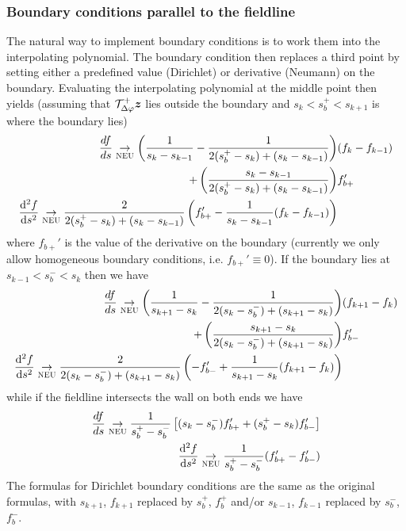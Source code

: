 \subsubsection{ Boundary conditions parallel to the fieldline}
The natural way to implement boundary conditions is to work them into the
interpolating polynomial. The boundary condition then replaces a third
point by setting
either a predefined value (Dirichlet) or derivative (Neumann) on the boundary.
Evaluating the interpolating polynomial at the middle point then yields
(assuming that $\mathcal T^+_{\Delta\varphi} {\boldsymbol{z}}$ lies outside the boundary and $s_k <s_b^+ < s_{k+1}$ is where the boundary lies)
\begin{align} \label{eq:paralleldis_neup}
    \frac{df}{ds}
    \underset{\textsc{NEU}}{\rightarrow}
    \left(\frac{ 1}{s_{k}-s_{k-1}} - \frac{1}{2(s_b^+-s_k) + (s_k-s_{k-1})} \right) &(f_k-f_{k-1})\nonumber\\
    +\left(\frac{s_k - s_{k-1}}{2(s_b^+-s_k) + (s_k-s_{k-1})}\right) &f_{b+}'\\
\label{eq:second_order_neup}
    \frac{\mathrm{d}^2 f}{\mathrm{d} s^2}
    \underset{\textsc{NEU}}{\rightarrow}
    \frac{2}{2(s_b^+-s_k) + (s_k-s_{k-1})}\left(  f_{b+}' - \frac{1}{s_k - s_{k-1}}(f_k-f_{k-1})\right)
\end{align}
where $f_{b+}'$ is the value of the  derivative on the boundary (currently we only allow homogeneous boundary conditions, i.e. $f_{b+}' \equiv 0$).
If the boundary lies at $s_{k-1}<s_b^-<s_k$ then we have
\begin{align} \label{eq:paralleldis_neum}
    \frac{df}{ds}
    \underset{\textsc{NEU}}{\rightarrow}
    \left(\frac{ 1}{s_{k+1}-s_k} - \frac{1}{2(s_k - s_b^-) + (s_{k+1}-s_k)} \right) &(f_{k+1}-f_k)\nonumber\\
    +\left(\frac{s_{k+1} - s_k}{2(s_k - s_b^-) + (s_{k+1}-s_k)}\right) &f_{b-}'
    \\
\label{eq:second_order_neum}
    \frac{\mathrm{d}^2 f}{\mathrm{d} s^2}
    \underset{\textsc{NEU}}{\rightarrow}
    \frac{2}{2(s_k -s_b^-) + (s_{k+1}-s_{k})}\left(  -f_{b-}' + \frac{1}{s_{k+1}-s_k} (f_{k+1} - f_k)\right)
\end{align}
while if the fieldline intersects the wall on both ends we have
\begin{align} \label{eq:paralleldis_neupm}
    \frac{df}{ds}
    \underset{\textsc{NEU}}{\rightarrow}
    \frac{ 1}{s_b^+ - s_b^-}\left[({ s_k - s_b^-})f_{b+}' + ({s_{b}^+-s_k}) f_{b-}'\right]    \\
\label{eq:second_order_neupm}
    \frac{\mathrm{d}^2 f}{\mathrm{d} s^2}
    \underset{\textsc{NEU}}{\rightarrow}
    \frac{ 1}{s_b^+ - s_b^-}( f_{b+}' - f_{b-}')
\end{align}
The formulas for Dirichlet boundary conditions are the same as the original
formulas, with $s_{k+1}$, $f_{k+1}$ replaced by $s_b^+$, $f_b^+$ and/or $s_{k-1}$, $f_{k-1}$ replaced by $s_b^-$, $f_b^-$.

